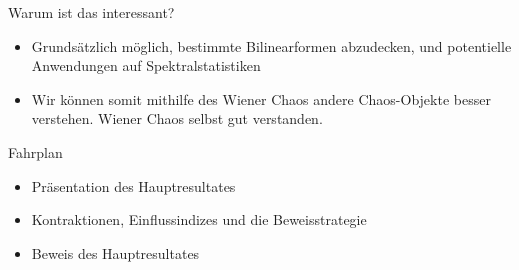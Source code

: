 \begin{frame}{Warum ist das interessant?}
    \begin{itemize}
        \item Grundsätzlich möglich, bestimmte Bilinearformen abzudecken, und potentielle Anwendungen auf Spektralstatistiken
        \pause
        \item Wir können somit mithilfe des Wiener Chaos andere Chaos-Objekte besser verstehen. Wiener Chaos selbst gut verstanden.
    \end{itemize}
\end{frame}
\begin{frame}{Fahrplan}
    \begin{itemize}
        \item Präsentation des Hauptresultates 
        \item Kontraktionen, Einflussindizes und die Beweisstrategie 
        \item Beweis des Hauptresultates
    \end{itemize}
\end{frame}